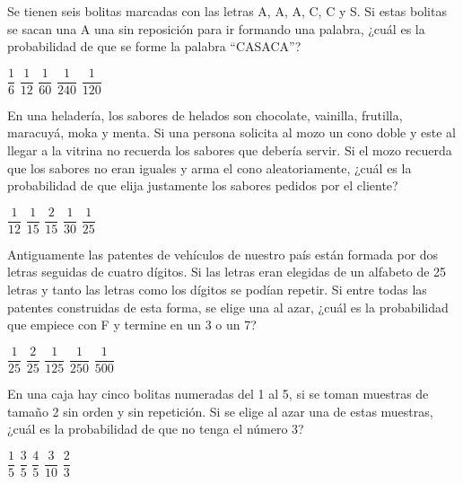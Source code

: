 \documentclass[sin nombre]{srs}
\begin{document}
\begin{preguntas}[after-item-skip=2cm]
\pregunta Se tienen seis bolitas marcadas con las letras A, A, A, C, C y S. Si estas bolitas se sacan una A una sin reposición para ir formando una palabra, ¿cuál es la probabilidad de que se forme la palabra “CASACA”?
\begin{vertical}
\alternativa $\dfrac{1}{6}$
\alternativa $\dfrac{1}{12}$
\alternativa $\dfrac{1}{60}$
\alternativa $\dfrac{1}{240}$
\alternativa $\dfrac{1}{120}$
\end{vertical}

\pregunta En una heladería, los sabores de helados son chocolate, vainilla, frutilla, maracuyá, moka y menta. Si una persona solicita al mozo un cono doble y este al llegar a la vitrina no recuerda los sabores que debería servir. Si el mozo recuerda que los sabores no eran iguales y arma el cono aleatoriamente, ¿cuál es la probabilidad de que elija justamente los sabores pedidos por el cliente?
\begin{vertical}
\alternativa $\dfrac{1}{12}$
\alternativa $\dfrac{1}{15}$
\alternativa $\dfrac{2}{15}$
\alternativa $\dfrac{1}{30}$
\alternativa $\dfrac{1}{25}$
\end{vertical}

\pregunta Antiguamente las patentes de vehículos de nuestro país están formada por dos letras seguidas de cuatro dígitos. Si las letras eran elegidas de un alfabeto de 25 letras y tanto las letras como los dígitos se podían repetir. Si entre todas las patentes construidas de esta forma, se elige una al azar, ¿cuál es la probabilidad que empiece con F y termine en un 3 o un 7?
\begin{vertical}
\alternativa $\dfrac{1}{25}$
\alternativa $\dfrac{2}{25}$
\alternativa $\dfrac{1}{125}$
\alternativa $\dfrac{1}{250}$
\alternativa $\dfrac{1}{500}$
\end{vertical}

\pregunta En una caja hay cinco bolitas numeradas del 1 al 5, si se toman muestras de tamaño 2 sin orden y sin repetición. Si se elige al azar una de estas muestras, ¿cuál es la probabilidad de que no tenga el número 3?
\begin{vertical}
\alternativa $\dfrac{1}{5}$
\alternativa $\dfrac{3}{5}$
\alternativa $\dfrac{4}{5}$
\alternativa $\dfrac{3}{10}$
\alternativa $\dfrac{2}{3}$
\end{vertical}


\end{preguntas}
\end{document}
